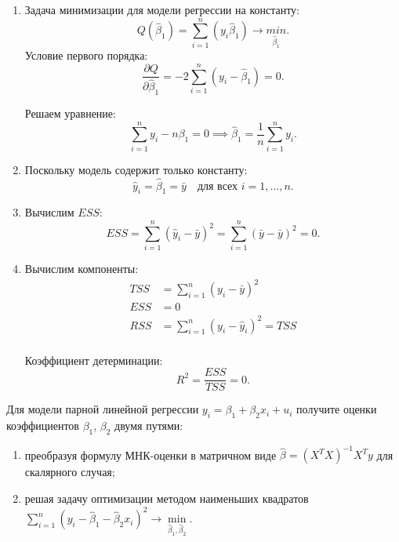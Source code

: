 \documentclass[12pt]{article}
\newcommand{\hb}{\hat{\beta}}
\newcommand{\ESS}{ESS}
\begin{document}
\begin{sol}
    
\begin{enumerate}
    \item Задача минимизации для модели регрессии на константу:
    \[
    Q(\hb_1) = \sum_{i=1}^n (y_i \hb_1) \to \underset{\hb_1}{min}.
    \]
Условие первого порядка:
\[
\frac{\partial Q}{\partial \hb_1} = -2\sum_{i=1}^n (y_i - \hb_1) = 0.
\]

Решаем уравнение:
\[
\sum_{i=1}^n y_i - n\beta_1 = 0 \implies \hb_1 = \frac{1}{n}\sum_{i=1}^n y_i.
\]


\item Поскольку модель содержит только константу:
\[
\hat{y}_i = \hat{\beta}_1 = \bar{y} \quad \text{для всех } i=1,\dots,n.
\]

\item Вычислим $\ESS$:
\[
\ESS = \sum_{i=1}^n (\hat{y}_i - \bar{y})^2 = \sum_{i=1}^n (\bar{y} - \bar{y})^2 = 0.
\]

\item Вычислим компоненты:
\begin{align*}
TSS &= \sum_{i=1}^n (y_i - \bar{y})^2 \\
ESS &= 0 \\
RSS &= \sum_{i=1}^n (y_i - \hat{y}_i)^2 = TSS \\
\end{align*}

Коэффициент детерминации:
\[
R^2 = \frac{ESS}{TSS} = 0.
\]
\end{enumerate}
\end{sol}

\begin{problem}
Для модели парной линейной регрессии $y_i = \beta_1 + \beta_2 x_i + u_i$ получите оценки коэффициентов $\beta_1$, $\beta_2$ двумя путями:

\begin{enumerate}
    \item преобразуя формулу МНК-оценки в матричном виде $\hb = (X^TX)^{-1}X^Ty$ для скалярного случая;
    \item решая задачу оптимизации методом наименьших квадратов $\sum^n_{i=1} (y_i - \hb_1 - \hb_2 x_i)^2 \to \underset{\hb_1, \hb_2}{\min}.$
\end{enumerate}   
\end{problem}
\end{document}
